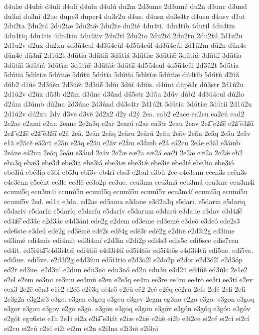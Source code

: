 {d4ulæ
d4ulǽ
d4uli
d4ulí
d4ulu
d4ulú
du2m
2d3ume
2d3umé
du2n
d3unc
d3und
du3ni
du3ní
d2uo
dupe3
duper4
du3r2u
d4us.
d4usn
du3s4tr
d4usu
d4usv
d1ut
2du2ta
2du2tá
2du2tæ
2du2tǽ
2du2te
du2té
4du4ti.
4du4tib
4dutil
4du4tin
4du4tiq
4du4tis
4du4tiu
4du4tiv
2du2tí
2du2to
2du2tó
2du2tu
2du2tú
2d1u2u
2d1u2v
d2ux
du2xu
4d3ū4cul
4d3ū4cŭl
4d5ū4cŭ́l
4d3ū4cúl
2d1ū2m
dū2n
dūn4e
dūn4ĕ
dū3nī
2d1ū2t
3dūtia
3dūtiā
3dūtiá
3dūtiæ
3dūtiǣ
3dūtiǽ
3dūtiī
3dūtĭa
3dūtĭā
3dūtĭá
3dūtĭæ
3dūtĭǣ
3dūtĭǽ
3dūtĭī
4d5ū́4cul
4d5ū́4cŭl
2d3ū́2t
5dū́tia
5dū́tiā
5dū́tiæ
5dū́tiǣ
5dū́tiī
5dū́tĭa
5dū́tĭā
5dū́tĭæ
5dū́tĭǣ
dū́4tĭb
5dū́tĭī
d2ŭă
dŭb2
d1ŭē
2d3ŭĕn
2d3ŭĕt
2d3ŭĕ́
3dŭī
3dŭĭ
4dŭĭs.
d4ŭnt
dŭpĕ3r
dŭ3str
2d1ŭ2u
2d1ŭ2v
d2ŭx
dŭ́3b
d2ŭ́m
d3ŭ́nc
d3ŭ́nd
dŭ́5str
2dŭ́u
2dŭ́v
dúb2
4d3ú4cul
dú2lo
d2úm
d3úmb
dú2na
2d3únc
2d3únd
dú3s4tr
2d1ú2t
3dútia
3dútiæ
3dútii
2d1ú2u
2d1ú2v
dú2xu
2dv
d3ve
d3vĕ
2d2x2
d2y
d2ý
2ea.
eab2
e2ace
ea2cu
ea2cú
ead2
2e2ae
e2ami
e2an
2eane
2e2a3q
e2ar
2earú
e2as
ea3tr
2eau
2eav
2ea͞
e2a͞e
e2á͞
e3á͞u
2ea͡
e2a͡e
e2á͡
e3á͡u
e2ā
2eā.
2eān
2eāq
2eāru
2eārú
2eāu
2eāv
2eā́n
2eā́q
2eā́u
2eā́v
e1ă
e2ăcĕ
eă2cŭ
e2ăn
e2ăq
e2ău
e2ăv
e2ắm
e3ắmb
e2á
eá2cu
2eáe
e3ál
e3ámb
2eáne
eá2nu
2eáq
2eáu
e3áud
2eáv
2e2æ
eæ2a
eæ2á
eæ2i
2e2ǣ
eǣ2a
2e2ǽ
eb2
eba3q
ebæ3
ebe3d
ebe3ia
ebe3iá
ebe3iæ
ebe3iǽ
ebe3ie
ebe3ié
ebe3io
ebe3ió
ebe3iú
ebé3io
e3bi
ebī3u
ebī3v
eb4ri
ebs3
e2bul
e3bŭ
2ec
e4c3enn
ecen3s
ecēn3s
e4c3énn
e5cént
ec3le
ec3lē
ec3o2p
ec3ue.
ecu3ma
ecu3mā
ecu3má
ecu3me
ecu3m4i
ecumi5q
ecu3m4ī
ecumī́5n
ecumī́5q
ecumī́5u
ecumī́5v
ecu3m4í
ecumí5q
ecumí5u
ecumí5v
2ed.
ed1a
e3da.
ed2ae
ed5ama
e3dane
e3d2a3q
e5dari.
e5darin
e5dariq
e5dariv
e5darín
e5daríq
e5daríu
e5darív
e5darum
e3darú
e3daue
e3dav
e3d4a͡e
ed4á͡e
ed3ā́c
e2d3ác
e4d3áni
ede2g
e2dem
ed3eme
ed3emé
e3deō
e3deó
ede2s3
ede6ste
e3deú
edē2g
ed3ēmē
edē2s
edḗ4g
edĕ3r
edé2g
e2diǣ
e2d3i2g
ed3ime
ed3imé
edi4mis
edi4mit
ed3i4mí
e2d3in
e2di2p
edi4s3
edis5c
edi6sce
edis7cen
ed4it.
ed5i4ta͞
e4d3i4tǣ
edi4tiō
e4d3i4tī
ed5i4tōr
ed5i4tōs
e4d3i4tū
edi5ue.
edi5ve.
edī5ue.
edī5ve.
e2d3í2g
e4d3ínu
ed5í4tiō
e2d3o2l
e2do2p
e2dōr
e2d3ó2l
e2d3óp
ed2r
ed3ue.
e2d3ul
e2dun
edu3no
edu3nó
ed2ū
edū3n
e3d2ŭ
ed4ŭĕ
ed3úlc
2e1e2
e2el
e2em
ee3mi
ee3mu
ee3mú
e2en
e2e3q
ee4ra
ee3re
ee4ro
ee4rō
ee3ti
ee3tí
e2ev
eex3
2e2ē
eēn3
e1ĕ2
e2ĕō
e2ĕ3q
eĕ4rō
e2ĕŭ
eĕ́2
2eé
e2éq
eé2ru
2efe
2efé
2efi
2efí
2e3g2a
e3g2æ3
e3ge.
e3gen
e3geq
e3geu
e3gev
2egm
eg3no
e2go
e3go.
e3gon
e3goq
e3gor
e3gou
e3gov
e2gō
e3gō.
e3gōn
e3gōq
e3gōu
e3gōv
e3gṓn
e3gṓq
e3gṓu
e3gṓv
e2gót
egu6ste
e1h
2e1i
ei2a
e2ia͡
e3iát
e2iæ
e2iǣ
e2iǽ
ei2b
e3i2ce
ei2cé
ei2ci
ei2cí
ei2cu
ei2cú
e2id
ei2i
ei2m
ei2n
e2i3na
e2i3ni
e2i3nī
}
